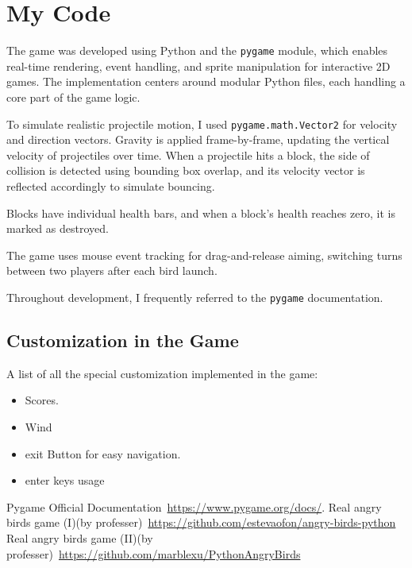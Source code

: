 \documentclass[10pt]{article}
\begin{document}
    \section{My Code}\label{sec:implementation}

The game was developed using Python and the \texttt{pygame} module, which enables real-time rendering, event handling, and sprite manipulation for interactive 2D games. The implementation centers around modular Python files, each handling a core part of the game logic.

To simulate realistic projectile motion, I used \texttt{pygame.math.Vector2} for velocity and direction vectors. Gravity is applied frame-by-frame, updating the vertical velocity of projectiles over time. When a projectile hits a block, the side of collision is detected using bounding box overlap, and its velocity vector is reflected accordingly to simulate bouncing.

Blocks have individual health bars, and when a block’s health reaches zero, it is marked as destroyed.

The game uses mouse event tracking for drag-and-release aiming, switching turns between two players after each bird launch.

Throughout development, I frequently referred to the \texttt{pygame}  documentation\cite{pygame}. 


    \subsection{Customization in the Game}\label{subsec:customisations-in-the-game}
    A list of all the special customization implemented in the game:
    \begin{itemize}
        \item Scores.
        \item Wind
        \item exit Button for easy navigation.
        \item enter keys usage
    \end{itemize}



    \begin{thebibliography}{5}
        Pygame Official Documentation\
        \url{https://www.pygame.org/docs/}.
        Real angry birds game (I)(by professer)\
        \url{https://github.com/estevaofon/angry-birds-python}
        \bibitem{angry_birds2}
        Real angry birds game (II)(by professer)\
        \url{https://github.com/marblexu/PythonAngryBirds}

    \end{thebibliography}
\end{document}
